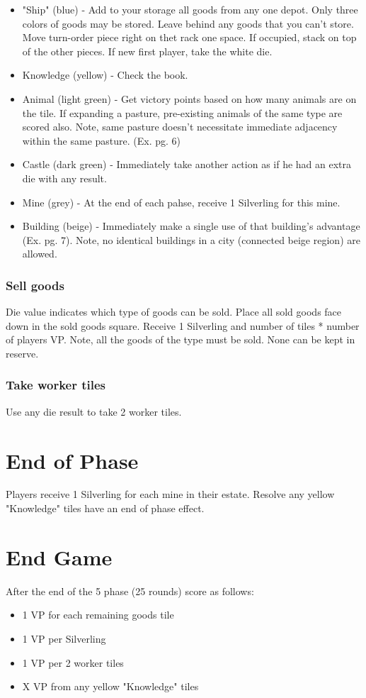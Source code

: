 \documentclass[12pt]{article}
\newenvironment{itemizeCustom}
{\begin{itemize}
  \setlength{\itemsep}{1pt}
  \setlength{\parskip}{0pt}
  \setlength{\parsep}{0pt}}
{\end{itemize}}
\begin{document}
\begin{multicols*}{2}
\begin{itemizeCustom}
	\item "Ship" (blue) - Add to your storage all goods from any one depot. Only three colors of goods may be stored. Leave behind any goods that you can't store. Move turn-order piece right on thet rack one space. If occupied, stack on top of the other pieces. If new first player, take the white die.
	\item Knowledge (yellow) - Check the book.
	\item Animal (light green) - Get victory points based on how many animals are on the tile. If expanding a pasture, pre-existing animals of the same type are scored also. Note, same pasture doesn't necessitate immediate adjacency within the same pasture. (Ex. pg. 6)
	\item Castle (dark green) - Immediately take another action as if he had an extra die with any result.
	\item Mine (grey) - At the end of each pahse, receive 1 Silverling for this mine.
	\item Building (beige) - Immediately make a single use of that building's advantage (Ex. pg. 7). Note, no identical buildings in a city (connected beige region) are allowed.
\end{itemizeCustom}

\subsubsection*{Sell goods}
Die value indicates which type of goods can be sold. Place all sold goods face down in the sold goods square. Receive 1 Silverling and number of tiles * number of players VP. Note, all the goods of the type must be sold. None can be kept in reserve.

\subsubsection*{Take worker tiles}
Use any die result to take 2 worker tiles.

\section*{End of Phase}
Players receive 1 Silverling for each mine in their estate. Resolve any yellow "Knowledge" tiles have an end of phase effect.

\section*{End Game}
After the end of the 5 phase (25 rounds) score as follows:

\begin{itemizeCustom}
	\item 1 VP for each remaining goods tile
	\item 1 VP per Silverling
	\item 1 VP per 2 worker tiles
	\item X VP from any yellow "Knowledge" tiles
\end{itemizeCustom}

\end{multicols*}
\end{document}
